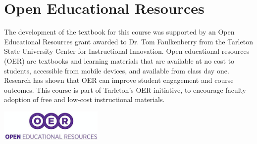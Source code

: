 \documentclass[10pt]{article}
\begin{document}
\section*{Open Educational Resources}
\label{sec:org2ca2f13}
The development of the textbook for this course was supported by an Open Educational Resources grant awarded to Dr. Tom Faulkenberry from the Tarleton State University Center for Instructional Innovation. Open educational resources (OER) are textbooks and learning materials that are available at no cost to students, accessible from mobile devices, and available from class day one. Research has shown that OER can improve student engagement and course outcomes. This course is part of Tarleton’s OER initiative, to encourage faculty adoption of free and low-cost instructional materials.


\begin{center}
\includegraphics[width=5cm]{oerLogo.png}
\end{center}
\end{document}
